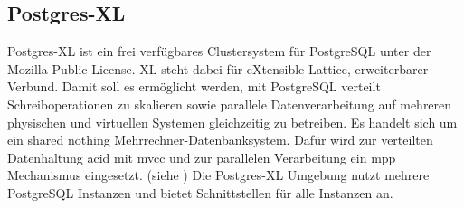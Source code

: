 \subsection{Postgres-XL}
\label{grundlagen:postgresxl}
Postgres-XL ist ein frei verfügbares Clustersystem für PostgreSQL unter der Mozilla Public License.
XL steht dabei für eXtensible Lattice, erweiterbarer Verbund.
Damit soll es ermöglicht werden, mit PostgreSQL verteilt Schreiboperationen zu skalieren sowie parallele Datenverarbeitung auf mehreren physischen und virtuellen Systemen gleichzeitig zu betreiben.
Es handelt sich um ein shared nothing Mehrrechner-Datenbanksystem.
Dafür wird zur verteilten Datenhaltung \Gls{acid} mit \Gls{mvcc} und zur parallelen Verarbeitung ein \Gls{mpp} Mechanismus eingesetzt. (siehe \cite{website:postgresxl-about})
Die Postgres-XL Umgebung nutzt mehrere PostgreSQL Instanzen und bietet Schnittstellen für alle Instanzen an.

